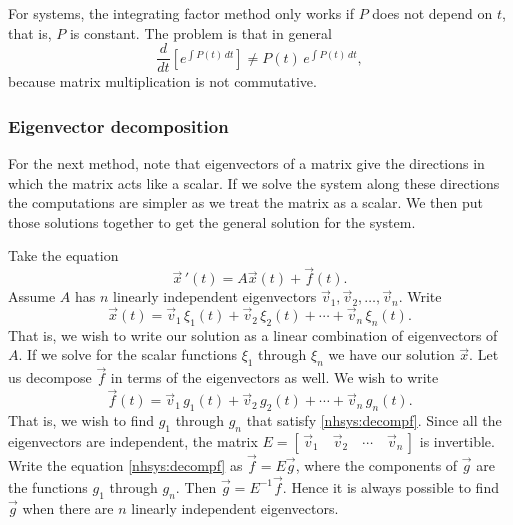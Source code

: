 \documentclass[12pt]{book}
\begin{document}
For systems, the integrating factor method
only works if $P$ does not depend on $t$, that is,
$P$ is constant.  The
problem is that in general
\begin{equation*}
\frac{d}{dt} \left[ e^{\int P(t)\,dt} \right] \not= P(t) \, e^{\int P(t)\,dt} ,
\end{equation*}
because matrix multiplication is not commutative.

\subsubsection{Eigenvector decomposition}%

For the next method, note that eigenvectors of a matrix give the 
directions in which the matrix acts like a scalar.  If we solve
the system along these directions the computations are simpler as we
treat the matrix as a scalar.  We then
put those solutions together to get the general solution
for the system.

Take the equation
\begin{equation} \label{nhsys:ednhsys}
{\vec{x}\,}' (t) = A \vec{x}(t) + \vec{f}(t) .
\end{equation}
Assume $A$ has $n$ linearly independent eigenvectors
$\vec{v}_1, \vec{v}_2, \ldots, \vec{v}_n$.  Write
\begin{equation} \label{nhsys:decompx}
\vec{x}(t) =
\vec{v}_1 \, \xi_1(t) + 
\vec{v}_2 \, \xi_2(t) + \cdots +
\vec{v}_n \, \xi_n(t) .
\end{equation}
That is, we wish to write our solution as a linear combination of
eigenvectors of $A$.
If we solve for the scalar functions $\xi_1$ through $\xi_n$ we have
our solution $\vec{x}$.
Let us decompose $\vec{f}$ in terms of the eigenvectors as well.  We wish to write
\begin{equation} \label{nhsys:decompf}
\vec{f}(t) =
\vec{v}_1 \, g_1(t) + 
\vec{v}_2 \, g_2(t) + \cdots +
\vec{v}_n \, g_n(t) .
\end{equation}
That is, we wish to find $g_1$ through $g_n$ that satisfy
\eqref{nhsys:decompf}.  Since all the eigenvectors
are independent, the matrix
$E = [\, \vec{v}_1 \quad \vec{v}_2 \quad \cdots \quad \vec{v}_n \,]$
is invertible.  Write the equation \eqref{nhsys:decompf}
as $\vec{f} = E \vec{g}$, where the components of
$\vec{g}$ are the functions $g_1$ through $g_n$.
Then $\vec{g} = E^{-1} \vec{f}$.
Hence it is always possible to find $\vec{g}$ when there
are $n$ linearly independent eigenvectors.
\end{document}
